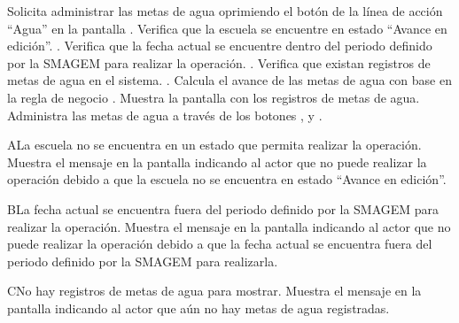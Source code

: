  \begin{UCtrayectoria}
    \UCpaso[\UCactor] Solicita administrar las metas de agua oprimiendo el botón \botAcciones de la línea de acción ``Agua'' en la pantalla .
    \UCpaso[\UCsist] Verifica que la escuela se encuentre en estado ``Avance en edición''. .
    \UCpaso[\UCsist] Verifica que la fecha actual se encuentre dentro del periodo definido por la SMAGEM para realizar la operación. .
    \UCpaso[\UCsist] Verifica que existan registros de metas de agua en el sistema. .
    \UCpaso[\UCsist] Calcula el avance de las metas de agua con base en la regla de negocio .
    \UCpaso[\UCsist] Muestra la pantalla  con los registros de metas de agua.
    \UCpaso[\UCactor] Administra las metas de agua a través de los botones \botMetas, \botAutoAjus y . \label{cus18:Administrar}
 \end{UCtrayectoria}
 
   \begin{UCtrayectoriaA}{A}{La escuela no se encuentra en un estado que permita realizar la operación.}
    \UCpaso[\UCsist] Muestra el mensaje  en la pantalla  indicando al actor que no puede realizar la operación debido a que la escuela no se encuentra en estado ``Avance en edición''. 
 \end{UCtrayectoriaA}
 
    \begin{UCtrayectoriaA}{B}{La fecha actual se encuentra fuera del periodo definido por la SMAGEM para realizar la operación.}
    \UCpaso[\UCsist] Muestra el mensaje  en la pantalla  indicando al actor que no puede realizar la operación debido a que la fecha actual se encuentra fuera del periodo definido por la SMAGEM para realizarla. 
 \end{UCtrayectoriaA}
 
  \begin{UCtrayectoriaA}{C}{No hay registros de metas de agua para mostrar.}
    \UCpaso[\UCsist] Muestra el mensaje  en la pantalla  indicando al actor que aún no hay metas de agua registradas. 
 \end{UCtrayectoriaA}
 


